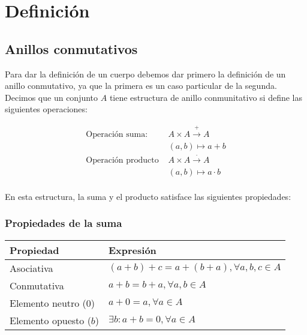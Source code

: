 \section{Definición}\label{cuerpos-finitos-definicion}

\subsection{Anillos conmutativos}\label{anillos-conmutativos}

Para dar la definición de un cuerpo debemos dar primero la definición de un anillo conmutativo, ya que la primera es un caso particular de la segunda.
Decimos que un conjunto $A$ tiene estructura de anillo conmunitativo si define las siguientes operaciones:

\[
	\begin{array}{rl}
		\text{Operación suma: }    & A \times A \xrightarrow{+} A     \\
                                 & (a,b) \mapsto a + b              \\
		\text{Operación producto } & A \times A \xrightarrow{\cdot} A \\
                                 & (a,b) \mapsto a \cdot b          \\
\end{array}
\]

En esta estructura, la suma y el producto satisface las siguientes propiedades:

\subsubsection{Propiedades de la suma}

\begin{center}
\begin{tabular}{l l}
	\textbf{Propiedad}     & \textbf{Expresión}                           \\
	\toprule
	Asociativa             & $(a+b) + c = a + (b+a), \forall a,b,c \in A$ \\
	Conmutativa            & $a+b = b+a, \forall a,b \in A$               \\
	Elemento neutro (0)    & $a+0 = a, \forall a \in A$                   \\
	Elemento opuesto ($b$) & $\exists b : a + b = 0, \forall a \in A$     \\
\end{tabular}
\end{center}

